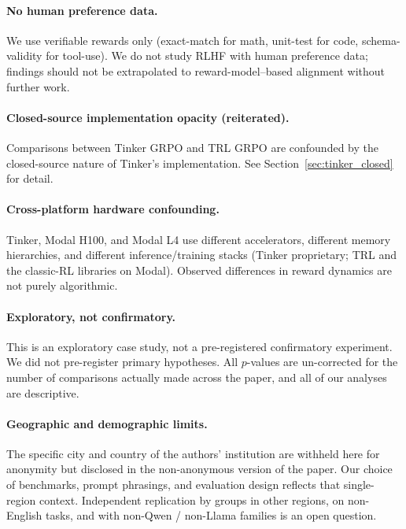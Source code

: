 \paragraph{No human preference data.}
We use verifiable rewards only (exact-match for math, unit-test for code,
schema-validity for tool-use). We do not study RLHF with human preference
data; findings should not be extrapolated to reward-model--based alignment
without further work.

\paragraph{Closed-source implementation opacity (reiterated).}
Comparisons between Tinker GRPO and TRL GRPO are confounded by the
closed-source nature of Tinker's implementation. See
Section~\ref{sec:tinker_closed} for detail.

\paragraph{Cross-platform hardware confounding.}
Tinker, Modal H100, and Modal L4 use different accelerators,
different memory hierarchies, and different inference/training stacks
(Tinker proprietary; TRL and the classic-RL libraries on Modal).
Observed differences in reward dynamics are not purely algorithmic.

\paragraph{Exploratory, not confirmatory.}
This is an exploratory case study, not a pre-registered confirmatory
experiment. We did not pre-register primary hypotheses. All $p$-values are
un-corrected for the number of comparisons actually made across the
paper, and all of our analyses are descriptive.

\paragraph{Geographic and demographic limits.}
The specific city and country of the authors' institution are withheld
here for anonymity but disclosed in the non-anonymous version of the
paper. Our choice of benchmarks, prompt phrasings, and evaluation design
reflects that single-region context. Independent replication by groups
in other regions, on non-English tasks, and with non-Qwen / non-Llama
families is an open question.

